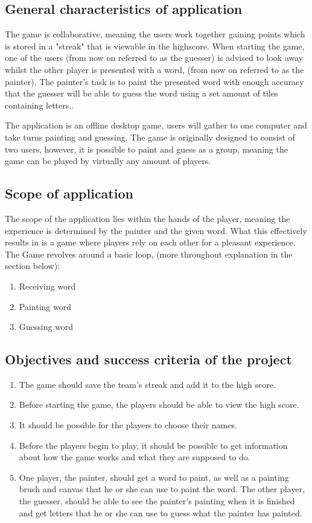 \documentclass[12pt,a4paper]{scrartcl}
\begin{document}
\subsection{General characteristics of application}

The game is collaborative, meaning the users work together gaining points which is stored in a "streak" that is viewable in the highscore.
When starting the game, one of the users (from now on referred to as the guesser) is advised to look away whilst the other player is presented with a word, (from now on referred to as the painter). The painter's task is to paint the presented word with enough accuracy that the guesser will be able to guess the word using a set amount of tiles containing letters.. 


The application is an offline desktop game, %
users will gather to one computer and take turns painting and guessing. The game is originally designed to consist of two users, however, it is possible to paint and guess as a group, meaning the game can be played by virtually any amount of players.

\subsection{Scope of application}
The scope of the application lies within the hands of the player, meaning the experience is determined by the painter and the given word. What this effectively results in is a game where players rely on each other for a pleasant experience. The Game revolves around a basic loop, (more throughout explanation in the section below): 
\begin{enumerate}
    \item Receiving word
    \item Painting word
    \item Guessing word
\end{enumerate}

\subsection{Objectives and success criteria of the project}
\begin{enumerate}
	\item The game should save the team's streak and add it to the high score.
	\item Before starting the game, the players should be able to view the high score.
	\item It should be possible for the players to choose their names.
	\item Before the players begin to play, it should be possible to get information about how the game works and what they are supposed to do.
	\item One player, the painter, should get a word to paint, as well as a painting brush and canvas that he or she can use to paint the word. The other player, the guesser, should be able to see the painter's painting when it is finished and get letters that he or she can use to guess what the painter has painted. 
\end{enumerate}
\end{document}

